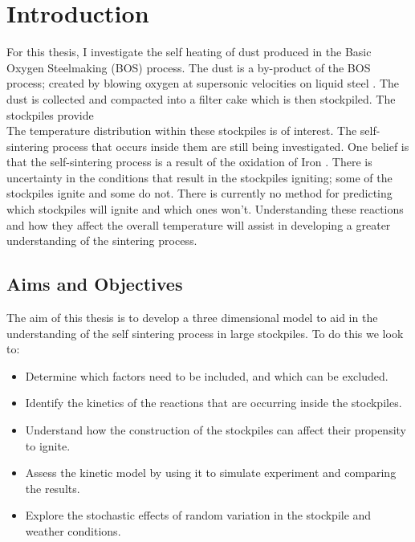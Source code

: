 \chapter{Introduction}
For this thesis, I investigate the self heating of dust produced in the Basic Oxygen Steelmaking (BOS) process. The dust is a by-product of the BOS process; created by blowing oxygen  at supersonic velocities on liquid steel \cite{Ray19}. The dust is collected and compacted into a filter cake which is then stockpiled. The stockpiles provide \\ 
The temperature distribution within these stockpiles is of interest. The self-sintering process that occurs inside them are still being investigated. 
One belief is that the self-sintering process is a result of the oxidation of Iron \cite{Ray19}. There is uncertainty in the conditions that result in the stockpiles igniting; some of the stockpiles ignite and some do not. There is currently no method for predicting which stockpiles will ignite and which ones won't.  Understanding these reactions and how they affect the overall temperature will assist in developing a greater understanding of the sintering process. 
\section{Aims and Objectives}
The aim of this thesis is to develop a three dimensional model to aid in the understanding of the self sintering process in large stockpiles. To do this we look to:
\begin{itemize}
\item Determine which factors need to be included, and which can be excluded.
\item Identify the kinetics of the reactions that are occurring inside the stockpiles.
\item Understand how the construction of the stockpiles can affect their propensity to ignite.
\item Assess the kinetic model by using it to simulate experiment and comparing the results. 
\item Explore the stochastic effects of random variation in the stockpile and weather conditions.
\end{itemize}
